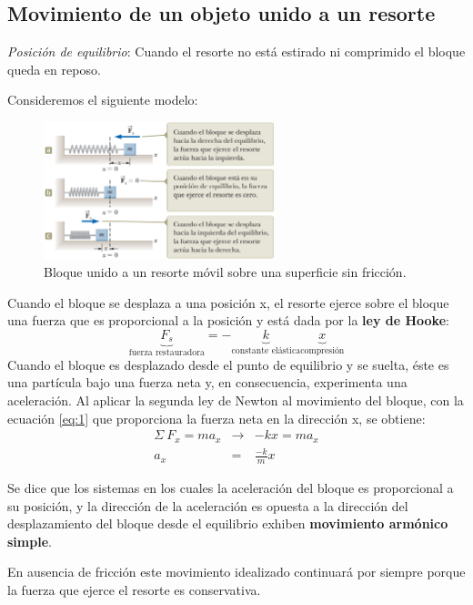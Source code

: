 \subsection{Movimiento de un objeto unido a un resorte}

  \PN \textit{Posición de equilibrio}: Cuando el resorte no está estirado ni comprimido el bloque queda en reposo.

  \vspace{3mm}
  \PN Consideremos el siguiente modelo:

  \begin{figure}[H]
  \centering
    \includegraphics[width=0.6\textwidth]{2/figure_1}
    \caption{Bloque unido a un resorte móvil sobre una superficie sin fricción.}
  \end{figure}

  \PN Cuando el bloque se desplaza a una posición x, el resorte ejerce sobre el bloque una fuerza que es proporcional a
  la posición y está dada por la \textbf{ley de Hooke}:
  \begin{equation}\label{eq:1}
    \underbrace{F_{s}}_{\text{fuerza restauradora}} = -\underbrace{k}_{\text{constante elástica}}\underbrace{x}_{\text{compresión}}
  \end{equation}
  \PN Cuando el bloque es desplazado desde el punto de equilibrio y se suelta, éste es una partícula bajo una fuerza
  neta y, en consecuencia, experimenta una aceleración. Al aplicar la segunda ley de Newton al movimiento del bloque,
  con la ecuación \ref{eq:1} que proporciona la fuerza neta en la dirección x, se obtiene:
  \begin{eqnarray*}
    \Sigma \ F_{x} = ma_{x} &\rightarrow& -kx = ma_{x} \\
    a_{x} &=& \frac{-k}{m}x
  \end{eqnarray*}

  \PN Se dice que los sistemas en los cuales la aceleración del bloque es proporcional a su posición, y la dirección de
  la aceleración es opuesta a la dirección del desplazamiento del bloque desde el equilibrio exhiben \textbf{movimiento
  armónico simple}.

  \PN En ausencia de fricción este movimiento idealizado continuará por siempre porque la fuerza que ejerce el resorte
  es conservativa.

